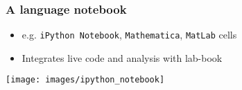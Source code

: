 \begin{frame}
  \frametitle{A language notebook}
  \begin{itemize}
    \item e.g. \texttt{iPython Notebook}, \texttt{Mathematica}, \texttt{MatLab} cells
    \item Integrates live code and analysis with lab-book
  \end{itemize}
  \begin{center}
    \texttt{[image: images/ipython\_notebook]}     
  \end{center}
\end{frame}

